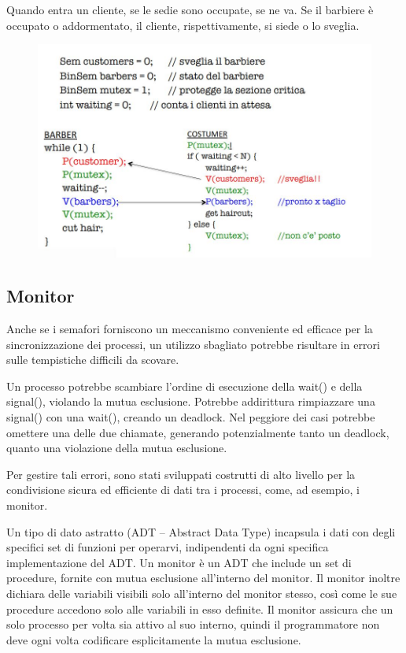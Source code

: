 \documentclass[a4paper]{article}
\begin{document}
Quando entra un cliente, se le sedie sono occupate, se ne va. Se il barbiere è occupato o addormentato, il cliente, rispettivamente, si siede o lo sveglia.
\begin{figure}[htb]
   \includegraphics[width=\linewidth]{img/barber.JPG}
\end{figure}

\subsection{Monitor}
Anche se i semafori forniscono un meccanismo conveniente ed efficace per la sincronizzazione dei processi, un utilizzo sbagliato potrebbe risultare in errori sulle tempistiche difficili da scovare.

Un processo potrebbe scambiare l'ordine di esecuzione della wait() e della signal(), violando la mutua esclusione. Potrebbe addirittura rimpiazzare una signal() con una wait(), creando un deadlock. Nel peggiore dei casi potrebbe omettere una delle due chiamate, generando potenzialmente tanto un deadlock, quanto una violazione della mutua esclusione.

Per gestire tali errori, sono stati sviluppati costrutti di alto livello per la condivisione sicura ed efficiente di dati tra i processi, come, ad esempio, i monitor.

Un tipo di dato astratto (ADT -- Abstract Data Type) incapsula i dati con degli specifici set di funzioni per operarvi, indipendenti da ogni specifica implementazione del ADT. Un monitor è un ADT che include un set di procedure, fornite con mutua esclusione all'interno del monitor. Il monitor inoltre dichiara delle variabili visibili solo all'interno del monitor stesso, così come le sue procedure accedono solo alle variabili in esso definite.\newline
Il monitor assicura che un solo processo per volta sia attivo al suo interno, quindi il programmatore non deve ogni volta codificare esplicitamente la mutua esclusione.
\end{document}
